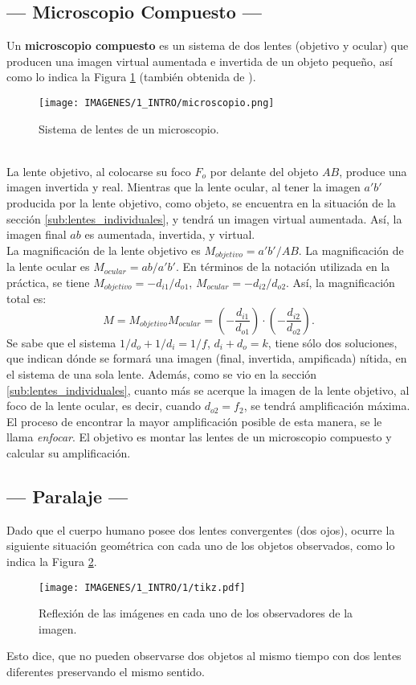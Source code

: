 \documentclass[10pt,a4paper]{article}
\begin{document}
\subsection{--- Microscopio Compuesto ---} %
\label{sub:microscopio_compuesto}
Un \textbf{microscopio compuesto} es un sistema de dos lentes (objetivo y ocular) que producen una imagen virtual aumentada e invertida de un objeto pequeño, así como lo indica la Figura \ref{fig:microscopio} (también obtenida de ).
\begin{figure}[ht]
	\centering
	\texttt{[image: IMAGENES/1\_INTRO/microscopio.png]}
	\caption{Sistema de lentes de un microscopio.}
	\label{fig:microscopio}
\end{figure}\\
La lente objetivo, al colocarse su foco \(F_o\) por delante del objeto \(AB\), produce una imagen invertida y real.
Mientras que la lente ocular, al tener la imagen \(a'b'\) producida por la lente objetivo, como objeto, se encuentra en la situación de la sección \ref{sub:lentes_individuales}, y tendrá un imagen virtual aumentada.
Así, la imagen final \(ab\) es aumentada, invertida, y virtual.\\

La magnificación de la lente objetivo es \(M_{objetivo} = a'b' /AB\).
La magnificación de la lente ocular es \(M_{ocular} = ab/a'b'\).
En términos de la notación utilizada en la práctica, se tiene \(M_{objetivo} = -d_{i1} /d_{o1}\), \(M_{ocular} = -d_{i2} / d_{o2}\).
Así, la magnificación total es:
\begin{equation}
	M = M_{objetivo} M_{ocular} = \left(-\dfrac{d_{i1}}{d_{o1}} \right)\cdot \left(-\dfrac{d_{i2}}{d_{o2}}\right).
	\label{eq:magnificacion_final}
\end{equation}
Se sabe que el sistema \(1/d_o+1/d_i=1/f\), \(d_i+d_o=k\), tiene sólo dos soluciones, que indican dónde se formará una imagen (final, invertida, ampificada) nítida, en el sistema de una sola lente.
Además, como se vio en la sección \ref{sub:lentes_individuales}, cuanto más se acerque la imagen de la lente objetivo, al foco de la lente ocular, es decir, cuando \(d_{o2} =f_2\), se tendrá amplificación máxima. El proceso de encontrar la mayor amplificación posible de esta manera, se le llama \textit{enfocar}. El objetivo es montar las lentes de un microscopio compuesto y calcular su amplificación.

\subsection{--- Paralaje ---} %
\label{sub:paralaje}
Dado que el cuerpo humano posee dos lentes convergentes (dos ojos), ocurre la siguiente situación geométrica con cada uno de los objetos observados, como lo indica la Figura \ref{fig:paralaje}.
\begin{figure}[ht]
	\centering
	\texttt{[image: IMAGENES/1\_INTRO/1/tikz.pdf]}
	\caption{Reflexión de las imágenes en cada uno de los observadores de la imagen.}
	\label{fig:paralaje}
\end{figure}
Esto dice, que no pueden observarse dos objetos al mismo tiempo con dos lentes diferentes preservando el mismo sentido.
\end{document}
